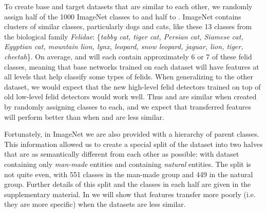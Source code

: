 To create base and target datasets that are similar to each other, we randomly assign half of the 1000 ImageNet classes to \dA and half to \dB.
ImageNet contains clusters of similar classes, particularly dogs and cats, like these 13 classes from the biological family \emph{Felidae}:
\{\textit{tabby cat, tiger cat, Persian cat, Siamese cat, Egyptian cat, mountain lion, lynx, 
leopard, snow leopard, jaguar, lion, tiger, cheetah}\}.
On average, \dA and \dB will each contain approximately 6 or 7 of these felid classes, meaning that base networks trained on each dataset will have features at all levels that help classify some types of felids. When generalizing to the other dataset, we would expect that the new high-level felid detectors trained on top of old low-level felid detectors would work well. Thus \dA and \dB are similar when created by randomly assigning classes to each, and we expect that transferred features will perform better than when \dA and \dB are less similar.

Fortunately, in ImageNet we are also provided with a hierarchy of parent classes. This information allowed us to create a special split of the dataset into two halves that are as semantically different from each other as possible: 
with dataset \dA containing only \emph{man-made} entities and \dB containing \emph{natural} entities.
The split is not quite even, with 551 classes in the man-made group and 449 in the natural group. Further details of this split and the classes in each half are given in the supplementary material. In  we will show that features transfer more poorly (i.e. they are more specific) when the datasets are less similar.



